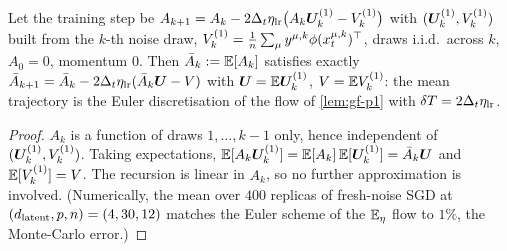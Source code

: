 \begin{proposition}\label{prop:sgdmean-p1}
Let the training step be $A_{k+1}=A_k-2\Delta_t\eta_{\rm lr}\big(A_k\bm{U}^{(1)}_k-V^{(1)}_k\big)$ with $(\bm{U}^{(1)}_k,V^{(1)}_k)$ built from the $k$-th noise draw, $V^{(1)}_k=\tfrac1{n}\sum_\mu y^{\mu,k}\phi(x^{\mu,k}_t)^{\top}$, draws i.i.d.\ across $k$, $A_0=0$, momentum $0$. Then $\bar A_k:=\mathbb{E}[A_k]$ satisfies exactly $\bar A_{k+1}=\bar A_k-2\Delta_t\eta_{\rm lr}(\bar A_k\bm{U}-V)$ with $\bm{U}=\mathbb{E}\bm{U}^{(1)}_k$, $V=\mathbb{E} V^{(1)}_k$: the mean trajectory is the Euler discretisation of the flow of \cref{lem:gf-p1} with $\delta T=2\Delta_t\eta_{\rm lr}$.
\end{proposition}
\begin{proof}
$A_k$ is a function of draws $1,\dots,k-1$ only, hence independent of $(\bm{U}^{(1)}_k,V^{(1)}_k)$. Taking expectations, $\mathbb{E}[A_k\bm{U}^{(1)}_k]=\mathbb{E}[A_k]\,\mathbb{E}[\bm{U}^{(1)}_k]=\bar A_k\bm{U}$ and $\mathbb{E}[V^{(1)}_k]=V$. The recursion is linear in $A_k$, so no further approximation is involved. (Numerically, the mean over $400$ replicas of fresh-noise SGD at $(d_{\mathrm{latent}},p,n)=(4,30,12)$ matches the Euler scheme of the $\mathbb{E}_\eta$ flow to $1\%$, the Monte-Carlo error.)
\end{proof}

